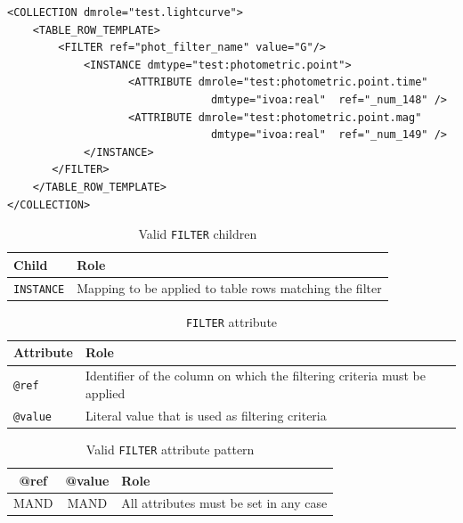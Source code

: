 \documentclass[11pt,a4paper]{ivoa}
\begin{document}
\begin{lstlisting}[caption={FILTER examples},style=XML]
<COLLECTION dmrole="test.lightcurve">
    <TABLE_ROW_TEMPLATE>
        <FILTER ref="phot_filter_name" value="G"/>
            <INSTANCE dmtype="test:photometric.point">
                   <ATTRIBUTE dmrole="test:photometric.point.time" 
                                dmtype="ivoa:real"  ref="_num_148" />
                   <ATTRIBUTE dmrole="test:photometric.point.mag" 
                                dmtype="ivoa:real"  ref="_num_149" />
            </INSTANCE>            
       </FILTER>
    </TABLE_ROW_TEMPLATE>
</COLLECTION>
\end{lstlisting}

\begin{table}[hbtp]
\small
\centering
\begin{tabulary}{\linewidth}{|L|J|}
       \hline  
          \textbf{Child} &  
          \textbf{Role}\\
       \hline  \hline
          \texttt{INSTANCE}    & 
          Mapping to be applied to table rows matching the filter \\       
       \hline 
     \end{tabulary}
     \caption{Valid  \texttt{FILTER} children} 
     \label{tbl:filter-children}
\end{table}

\begin{table}[!htbp]
\small
\centering
\begin{tabulary}{\linewidth}{|L|J|}
       \hline
           \textbf{Attribute} &  
           \textbf{Role} \\
       \hline  \hline
           \texttt{@ref}    & 
           Identifier of the column on which the filtering criteria must be applied \\       
        \hline 
           \texttt{@value}    & 
           Literal value that is used as filtering criteria \\       
        \hline 
\end{tabulary}
\caption{\texttt{FILTER} attribute} 
\label{tbl:filter-att}
\end{table}

\begin{table}[!htbp]
\small
\centering
\begin{tabulary}{\linewidth}{|C|CJ|}
       \hline
           \textbf{@ref} &  
           \textbf{@value} &                     

           \textbf{Role} \\
       \hline   \hline
           MAND    &            

           MAND    & 
           All attributes must be set in any case \\       
       \hline 
\end{tabulary}
\caption{Valid \texttt{FILTER} attribute pattern} 
\label{tbl:filter-patterns}
\end{table}
\end{document}
